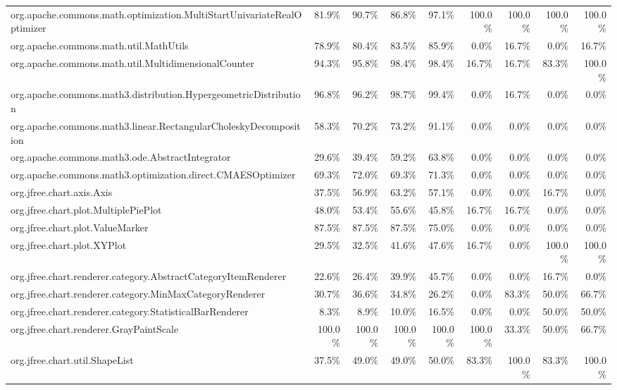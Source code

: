 \begin{tabular}{ l rrrr rrrr}
org.apache.commons.math.optimization.MultiStartUnivariateRealOptimizer &  81.9\% &  90.7\% &  86.8\% &  97.1\% &  100.0\% &  100.0\% &  100.0\% &  100.0\%\\ 
org.apache.commons.math.util.MathUtils &  78.9\% &  80.4\% &  83.5\% &  85.9\% &  0.0\% &  16.7\% &  0.0\% &  16.7\%\\ 
org.apache.commons.math.util.MultidimensionalCounter &  94.3\% &  95.8\% &  98.4\% &  98.4\% &  16.7\% &  16.7\% &  83.3\% &  100.0\%\\ 
org.apache.commons.math3.distribution.HypergeometricDistribution &  96.8\% &  96.2\% &  98.7\% &  99.4\% &  0.0\% &  16.7\% &  0.0\% &  0.0\%\\ 
org.apache.commons.math3.linear.RectangularCholeskyDecomposition &  58.3\% &  70.2\% &  73.2\% &  91.1\% &  0.0\% &  0.0\% &  0.0\% &  0.0\%\\ 
org.apache.commons.math3.ode.AbstractIntegrator &  29.6\% &  39.4\% &  59.2\% &  63.8\% &  0.0\% &  0.0\% &  0.0\% &  0.0\%\\ 
org.apache.commons.math3.optimization.direct.CMAESOptimizer &  69.3\% &  72.0\% &  69.3\% &  71.3\% &  0.0\% &  0.0\% &  0.0\% &  0.0\%\\ 
org.jfree.chart.axis.Axis &  37.5\% &  56.9\% &  63.2\% &  57.1\% &  0.0\% &  0.0\% &  16.7\% &  0.0\%\\ 
org.jfree.chart.plot.MultiplePiePlot &  48.0\% &  53.4\% &  55.6\% &  45.8\% &  16.7\% &  16.7\% &  0.0\% &  0.0\%\\ 
org.jfree.chart.plot.ValueMarker &  87.5\% &  87.5\% &  87.5\% &  75.0\% &  0.0\% &  0.0\% &  0.0\% &  0.0\%\\ 
org.jfree.chart.plot.XYPlot &  29.5\% &  32.5\% &  41.6\% &  47.6\% &  16.7\% &  0.0\% &  100.0\% &  100.0\%\\ 
org.jfree.chart.renderer.category.AbstractCategoryItemRenderer &  22.6\% &  26.4\% &  39.9\% &  45.7\% &  0.0\% &  0.0\% &  16.7\% &  0.0\%\\ 
org.jfree.chart.renderer.category.MinMaxCategoryRenderer &  30.7\% &  36.6\% &  34.8\% &  26.2\% &  0.0\% &  83.3\% &  50.0\% &  66.7\%\\ 
org.jfree.chart.renderer.category.StatisticalBarRenderer &  8.3\% &  8.9\% &  10.0\% &  16.5\% &  0.0\% &  0.0\% &  50.0\% &  50.0\%\\ 
org.jfree.chart.renderer.GrayPaintScale &  100.0\% &  100.0\% &  100.0\% &  100.0\% &  100.0\% &  33.3\% &  50.0\% &  66.7\%\\ 
org.jfree.chart.util.ShapeList &  37.5\% &  49.0\% &  49.0\% &  50.0\% &  83.3\% &  100.0\% &  83.3\% &  100.0\%\\ 

\end{tabular}
